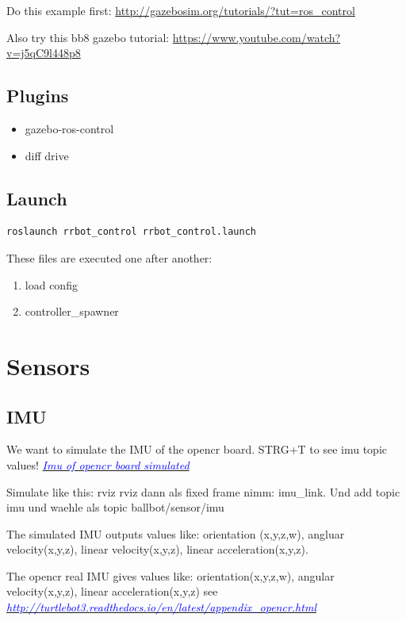 \documentclass[twoside,colorback,accentcolor=tud4c,11pt]{tudreport}
\newcommand{\mylink}[2] {	\href{#1}{	\textit{\textcolor{blue}{#2}}}}
\begin{document}
	Do this example first: \url{http://gazebosim.org/tutorials/?tut=ros_control}
	
	Also try this bb8 gazebo tutorial: \url{https://www.youtube.com/watch?v=j5qC9l448p8}
	
	
	
	\subsection{Plugins}
	\begin{itemize}
		\item gazebo-ros-control
		\item diff drive
	\end{itemize}
	
	\subsection{Launch}
	\begin{lstlisting}[style=BashInputStyle]
	roslaunch rrbot_control rrbot_control.launch
	\end{lstlisting}
	
	These files are executed one after another:
	\begin{enumerate}
		\item load config
		\item controller\_spawner
	\end{enumerate}
	
	\section{Sensors}
	\subsection{IMU}
	
		We want to simulate the IMU of the opencr board. STRG+T to see imu topic values!
	\mylink{https://www.youtube.com/watch?v=wXN_7oRHst0}{Imu of opencr board simulated}

	Simulate like this:
	rviz rviz dann als fixed frame nimm: imu\_link. Und add topic imu und waehle als topic ballbot/sensor/imu
	
	The simulated IMU outputs values like: orientation (x,y,z,w), angluar velocity(x,y,z), linear velocity(x,y,z), linear acceleration(x,y,z).
	
	The opencr real IMU gives values like: orientation(x,y,z,w), angular velocity(x,y,z), linear acceleration(x,y,z) see \mylink{OpenCR board IMU }{http://turtlebot3.readthedocs.io/en/latest/appendix\_opencr.html}
	
\end{document}
